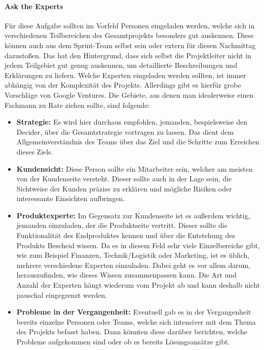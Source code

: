 \paragraph{Ask the Experts}
Für diese Aufgabe sollten im Vorfeld Personen eingeladen werden, welche sich in verschiedenen Teilbereichen des Gesamtprojekts besonders gut auskennen. Diese können auch aus dem Sprint-Team selbst sein oder extern für diesen Nachmittag dazustoßen. Das hat den Hintergrund, dass sich selbst die Projektleiter nicht in jedem Teilgebiet gut genug auskennen, um detaillierte Beschreibungen und Erklärungen zu liefern. Welche Experten eingeladen werden sollten, ist immer abhängig von der Komplexität des Projekts. Allerdings gibt es hierfür grobe Vorschläge von Google Ventures.
Die Gebiete, aus denen man idealerweise einen Fachmann zu Rate ziehen sollte, sind folgende: 
\begin{itemize}
	\item \textbf{Strategie:}
	Es wird hier durchaus empfohlen, jemanden, bespielsweise den Decider, über die Gesamtstrategie vortragen zu lassen. Das dient dem Allgemeinverständnis des Teams über das Ziel und die Schritte zum Erreichen dieses Ziels. 
	\item \textbf{Kundensicht:}
	Diese Person sollte ein Mitarbeiter sein, welcher am meisten von der Kundenseite versteht. Dieser sollte auch in der Lage sein, die Sichtweise der Kunden präzise zu erklären und mögliche Risiken oder interessante Einsichten aufbringen.
	\item \textbf{Produktexperte:}
	Im Gegensatz zur Kundenseite ist es außerdem wichtig, jemanden einzuladen, der die Produktseite vertritt. Dieser sollte die Funktionalität des Endproduktes kennen und über die Entstehung des Produkts Bescheid wissen. Da es in diesem Feld sehr viele Einzelbereiche gibt, wie zum Beispiel Finanzen, Technik/Logistik oder Marketing, ist es üblich, mehrere verschiedene Experten einzuladen. Dabei geht es vor allem darum, herauszufinden, wie dieses Wissen zusammenpassen kann. Die Art und Anzahl der Experten hängt wiederum vom Projekt ab und kann deshalb nicht pauschal eingegrenzt werden.
	\item \textbf{Probleme in der Vergangenheit:}
	Eventuell gab es in der Vergangenheit bereits einzelne Personen oder Teams, welche sich intensiver mit dem Thema des Projekts befasst haben. Dann könnten diese darüber berichten, welche Probleme aufgekommen sind oder ob es bereits Lösungsansätze gibt.
\end{itemize}

